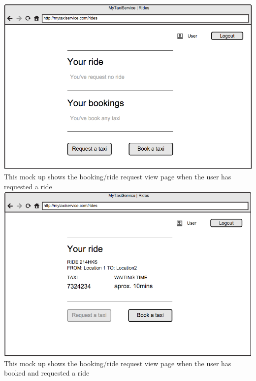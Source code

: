 \documentclass[11pt]{article} %
\begin{document}
        \includegraphics[scale=0.52]{viewEmptyInt.png}\newline
        \newpage
        \noindent
        This mock up shows the booking/ride request view page when the user has requested a ride \newline
        \newline
        \includegraphics[scale=0.52]{viewReqInt.png}\newline
        \newpage
        \noindent
        This mock up shows the booking/ride request view page when the user has booked and requested a ride\newline
        \newline
\end{document}
